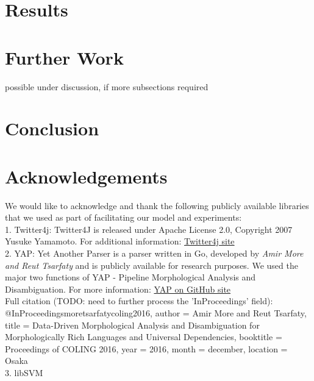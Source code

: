 \documentclass[a4paper]{article}
\begin{document}
\section{Results}
\label{Results}

\section{Further Work}
\label{Further Work}

possible under discussion, if more subsections required
\section{Conclusion}
\label{Conclusion}

\section{Acknowledgements}
\label{Acknowledgements}
We would like to acknowledge and thank the following publicly available libraries that we used as part of facilitating our model and experiments:\\
1. Twitter4j: Twitter4J is released under Apache License 2.0, Copyright 2007 Yusuke Yamamoto. For additional information: 
	\href{http://twitter4j.org/en/index.html}{Twitter4j site}\\
2. YAP: Yet Another Parser is a parser written in Go, developed by \emph{Amir More and Reut Tsarfaty} and is publicly available for research purposes. We used the major two functions of YAP - Pipeline Morphological Analysis and Disambiguation. For more information: 
		\href{https://github.com/habeanf/yap}{YAP on GitHub site}\\
Full citation (TODO: need to further process the 'InProceedings' field):\\
@InProceedings{moretsarfatycoling2016,
  author = {Amir More and Reut Tsarfaty},
  title = {Data-Driven Morphological Analysis and Disambiguation for Morphologically Rich Languages and Universal Dependencies},
  booktitle = {Proceedings of COLING 2016},
  year = {2016},
  month = {december},
  location = {Osaka}
}\\
3. libSVM\\
\end{document}
